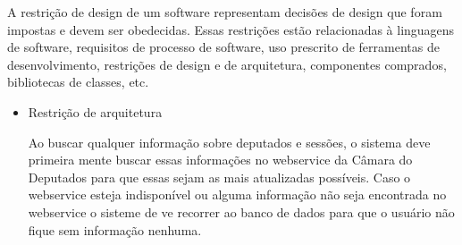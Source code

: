 A restrição de design de um software representam decisões de design que foram impostas e devem ser obedecidas. Essas restrições estão relacionadas à linguagens de software, requisitos de processo de software, uso prescrito de ferramentas de desenvolvimento, restrições de design e de arquitetura, componentes comprados, bibliotecas de classes, etc.

\begin{itemize} 

	\item{Restrição de arquitetura}

		Ao buscar qualquer informação sobre deputados e sessões, o sistema deve primeira mente buscar essas informações no webservice da Câmara do Deputados para que essas sejam as mais atualizadas possíveis. Caso o webservice esteja indisponível ou alguma informação não seja encontrada no webservice o sisteme de ve recorrer ao banco de dados para que o usuário não fique sem informação nenhuma.

\end{itemize}